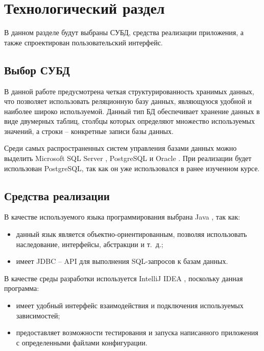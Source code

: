\chapter{Технологический раздел}

В данном разделе будут выбраны СУБД, средства реализации приложения, а также спроектирован пользовательский интерфейс.

\section{Выбор СУБД}

В данной работе предусмотрена четкая структурированность хранимых данных, что позволяет использовать реляционную базу данных, являющуюся удобной и наиболее широко используемой. Данный тип БД обеспечивает хранение данных в виде двумерных таблиц, столбцы которых определяют множество используемых значений, а строки -- конкретные записи базы данных. 

Среди самых распространенных систем управления базами данных можно выделить Microsoft SQL Server \cite{ms_sql}, PostgreSQL \cite{postgresql} и  Oracle \cite{oracle}. При реализации будет использован PostgreSQL, так как он уже использовался в ранее изученном курсе.

\section{Средства реализации}

В качестве используемого языка программирования выбрана Java \cite{java}, так как:
\begin{itemize}
	\item данный язык является объектно-ориентированным, позволяя использовать наследование, интерфейсы, абстракции и т.~д.;
	\item имеет JDBC \cite{jdbc} -- API для выполнения SQL-запросов к базам данных.
\end{itemize}

В качестве среды разработки используется IntelliJ IDEA \cite{intellij_idea}, поскольку данная программа:
\begin{itemize}
	\item имеет удобный интерфейс взаимодействия и подключения используемых зависимостей;
	\item предоставляет возможности тестирования и запуска написанного приложения с определенными файлами конфигурации.
\end{itemize}

